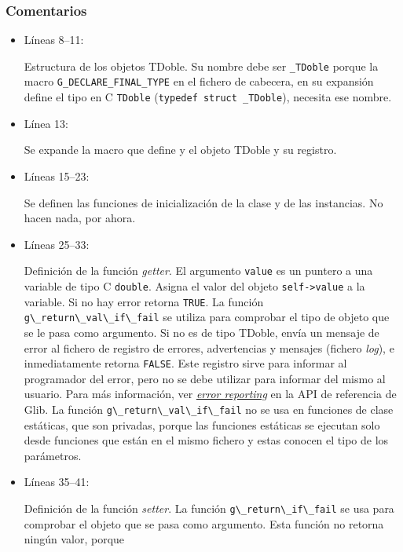\subsubsection{Comentarios}
\begin{itemize}
\item Líneas 8--11:\par
  Estructura de los objetos \textsf{TDoble}. Su nombre debe ser \texttt{\_TDoble} porque la macro
  \texttt{G\_DECLARE\_FINAL\_TYPE} en el fichero de cabecera, en su expansión define el tipo en C
  \texttt{TDoble} (\texttt{typedef struct \_TDoble}), necesita ese nombre.
\item Línea 13:\par
  Se expande la macro que define y  el objeto \textsf{TDoble} y su registro.
\item Líneas 15--23:\par
  Se definen las funciones de inicialización de la clase y de las instancias. No hacen nada, por ahora.
\item Líneas 25--33:\par
  Definición de la función \textit{getter}. El argumento \texttt{value} es un puntero a una variable de tipo C
  \texttt{double}. Asigna el valor del objeto \texttt{self->value} a la variable. Si no hay error retorna \texttt{TRUE}.
  La función \passthrough{\lstinline!g\_return\_val\_if\_fail!} se utiliza para comprobar el tipo de objeto que
  se le pasa como argumento. Si no es de tipo \textsf{TDoble}, envía un mensaje de error al fichero
  de registro de errores, advertencias y mensajes (fichero \textit{log}), e inmediatamente retorna \texttt{FALSE}.
  Este registro sirve para informar al programador del error, pero no se debe utilizar para informar del
  mismo al usuario. Para más información, ver \href{https://docs.gtk.org/glib/error-reporting.html}
  {\textit{error reporting}} en la API de referencia de Glib.
  {\color{red}
  La función \passthrough{\lstinline!g\_return\_val\_if\_fail!} no se usa en funciones de clase estáticas, que son
  privadas, porque las funciones estáticas se ejecutan solo desde funciones que están en el mismo fichero y estas
  conocen el tipo de los parámetros\footnotemark{}.}
\item Líneas 35--41:\par
  Definición de la función \textit{setter}. La función \passthrough{\lstinline!g\_return\_if\_fail!} se usa
  para comprobar el objeto que se pasa como argumento. Esta función no retorna ningún valor, porque

\end{itemize}
